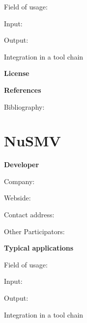 \documentclass{./template/openetcs_report}
\begin{document}
	Field of usage:


	Input:

	Output:





	Integration in a tool chain



	\textbf{License}


	\textbf{References}

	Bibliography:


\section{NuSMV}

	\textbf{Developer}

	Company: 

	Webside:

	Contact address:

	Other  Participators:



	\textbf{Typical applications}

	Field of usage:


	Input:

	Output:





	Integration in a tool chain
\end{document}
